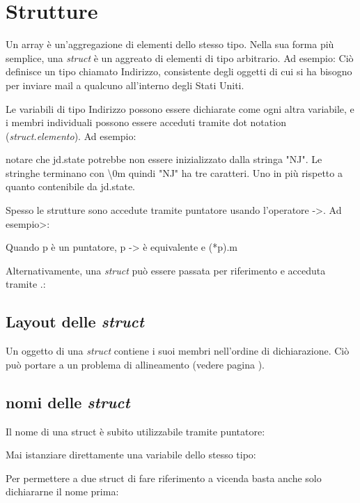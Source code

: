 \documentclass[11pt,a4paper]{book}
\begin{document}
\section{Strutture}
Un array è un'aggregazione di elementi dello stesso tipo. Nella sua forma più semplice, una \emph{struct} è un aggreato di elementi di tipo arbitrario. Ad esempio:
\label{code: 103}
Ciò definisce un tipo chiamato Indirizzo, consistente degli oggetti di cui si ha bisogno per inviare mail a qualcuno all'interno degli Stati Uniti.

Le variabili di tipo Indirizzo possono essere dichiarate come ogni altra variabile, e i membri individuali possono essere acceduti tramite dot notation (\emph{struct.elemento}). Ad esempio:
\label{code: 104}

notare che jd.state potrebbe non essere inizializzato dalla stringa "NJ". Le stringhe terminano con \textbackslash0m quindi "NJ" ha tre caratteri. Uno in più rispetto a quanto contenibile da jd.state.

Spesso le strutture sono accedute tramite puntatore usando l'operatore ->. Ad esempio>:
\label{code: 105}

Quando p è un puntatore, p -> è equivalente e (*p).m

Alternativamente, una \emph{struct} può essere passata per riferimento e acceduta tramite .:
\label{code: 106}

\subsection{Layout delle \emph{struct}}
Un oggetto di una \emph{struct} contiene i suoi membri nell'ordine di dichiarazione. Ciò può portare a un problema di allineamento (vedere pagina \pageref{par: Allineamento}).

\subsection{nomi delle \emph{struct}}
Il nome di una struct è subito utilizzabile tramite puntatore:
\label{code: 107}

Mai istanziare direttamente una variabile dello stesso tipo:
\label{code: 108}

Per permettere a due struct di fare riferimento a vicenda basta anche solo dichiararne il nome prima:
\label{code: 109}
\end{document}
